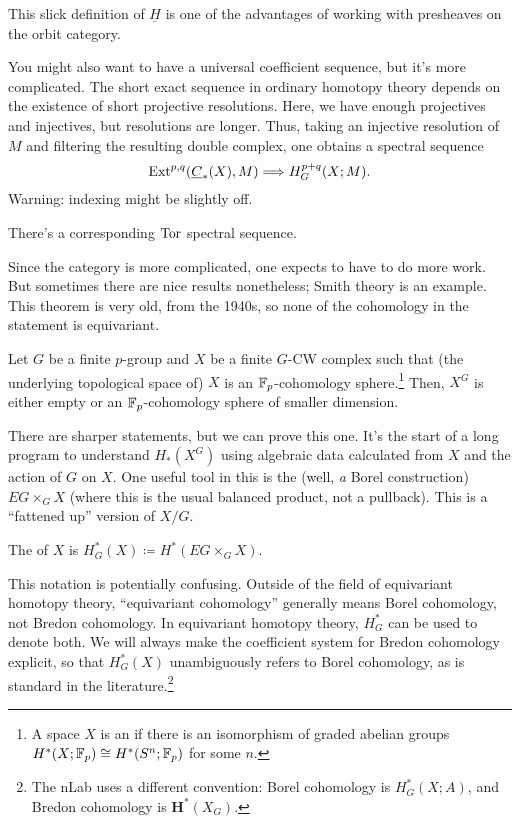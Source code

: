This slick definition of $\underline H$ is one of the advantages of working with presheaves on the orbit category.
\begin{rem}
You might also want to have a universal coefficient sequence, but it's more complicated. The short exact sequence
in ordinary homotopy theory depends on the existence of short projective resolutions. Here, we have enough
projectives and injectives, but resolutions are longer. Thus, taking an injective resolution of $M$ and filtering
the resulting double complex, one obtains a spectral sequence
\[\operatorname{Ext}^{p,q}(\underline C_*(X), M)\Longrightarrow H_G^{p+q}(X;M).\]
{\color{red}Warning}: indexing might be slightly off.

There's a corresponding $\operatorname{Tor}$ spectral sequence.
\end{rem}
Since the category is more complicated, one expects to have to do more work. But sometimes there are nice results
nonetheless; Smith theory is an example. This theorem is very old, from the 1940s, so none of the cohomology in the
statement is equivariant.
\begin{thm}[Smith]
\label{smith}
Let $G$ be a finite $p$-group and $X$ be a finite $G$-CW complex such that (the underlying topological space of)
$X$ is an $\mathbb F_p$-cohomology sphere.\footnote{A space $X$ is an  if there is an
isomorphism of graded abelian groups $H^*(X;\mathbb F_p)\cong H^*(S^n;\mathbb F_p)$ for some $n$.} Then, $X^G$ is either empty or
an $\mathbb F_p$-cohomology sphere of smaller dimension.
\end{thm}
There are sharper statements, but we can prove this one. It's the start of a long program to understand $H_*(X^G)$
using algebraic data calculated from $X$ and the action of $G$ on $X$. One useful tool in this is the  (well, \emph a Borel construction) $EG\times_G X$ (where this is the usual balanced product, not a
pullback). This is a ``fattened up'' version of $X/G$.
\begin{defn}
The  of $X$ is $H_G^*(X) \coloneqq H^*(EG\times_G X)$.
\end{defn}
\begin{warn}
This notation is potentially confusing. Outside of the field of equivariant homotopy theory, ``equivariant
cohomology'' generally means Borel cohomology, not Bredon cohomology. In equivariant homotopy theory, $H_G^*$ can
be used to denote both. We will always make the coefficient system for Bredon cohomology explicit, so that
$H_G^*(X)$ unambiguously refers to Borel cohomology, as is standard in the literature.\footnote{The nLab uses a
different convention: Borel cohomology is $H_G^*(X;A)$, and Bredon cohomology is $\mathbf H^*(X_G)$.}
\end{warn}
